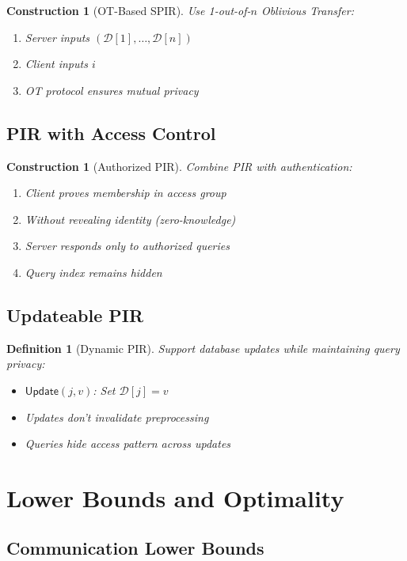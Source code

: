 \documentclass[11pt,final]{article}
\newcommand{\DB}{\mathcal{D}}
\newtheorem{definition}[theorem]{Definition}
\newtheorem{construction}[theorem]{Construction}
\begin{document}
\begin{construction}[OT-Based SPIR]
Use 1-out-of-$n$ Oblivious Transfer:
\begin{enumerate}
    \item Server inputs $(\DB[1], \ldots, \DB[n])$
    \item Client inputs $i$
    \item OT protocol ensures mutual privacy
\end{enumerate}
\end{construction}

\subsection{PIR with Access Control}

\begin{construction}[Authorized PIR]
Combine PIR with authentication:
\begin{enumerate}
    \item Client proves membership in access group
    \item Without revealing identity (zero-knowledge)
    \item Server responds only to authorized queries
    \item Query index remains hidden
\end{enumerate}
\end{construction}

\subsection{Updateable PIR}

\begin{definition}[Dynamic PIR]
Support database updates while maintaining query privacy:
\begin{itemize}
    \item $\mathsf{Update}(j, v)$: Set $\DB[j] = v$
    \item Updates don't invalidate preprocessing
    \item Queries hide access pattern across updates
\end{itemize}
\end{definition}

\section{Lower Bounds and Optimality}

\subsection{Communication Lower Bounds}
\end{document}
